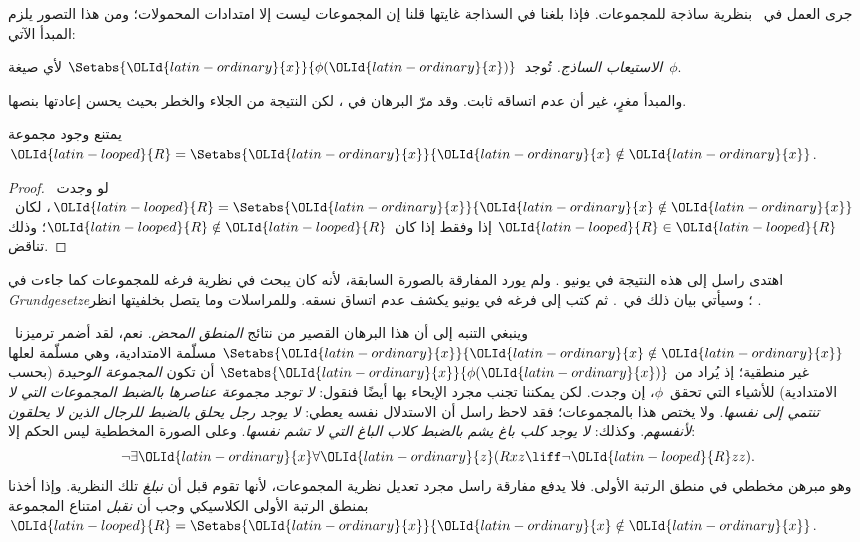 \documentclass[../../../include/open-logic-section]{subfiles}
\begin{document}

جرى العمل في~ بنظرية ساذجة للمجموعات. فإذا بلغنا
في السذاجة غايتها قلنا إن المجموعات ليست إلا امتدادات المحمولات؛ ومن
هذا التصور يلزم المبدأ الآتي:

\begin{defish}
  \emph{الاستيعاب الساذج.} تُوجد~$\Setabs{\OLId{latin-ordinary}{x}}{\phi(\OLId{latin-ordinary}{x})}$ لأي صيغة~$\phi$.
\end{defish}

والمبدأ مغرٍ، غير أن عدم اتساقه ثابت. وقد مرّ البرهان في
، لكن النتيجة من الجلاء والخطر بحيث يحسن
إعادتها بنصها.

\begin{thm}
يمتنع وجود مجموعة~$\OLId{latin-looped}{R} = \Setabs{\OLId{latin-ordinary}{x}}{\OLId{latin-ordinary}{x} \notin \OLId{latin-ordinary}{x}}$.
\end{thm}

\begin{proof}
لو وجدت~$\OLId{latin-looped}{R} = \Setabs{\OLId{latin-ordinary}{x}}{\OLId{latin-ordinary}{x} \notin \OLId{latin-ordinary}{x}}$، لكان~$\OLId{latin-looped}{R} \in \OLId{latin-looped}{R}$ إذا وفقط إذا
كان~$\OLId{latin-looped}{R} \notin \OLId{latin-looped}{R}$؛ وذلك تناقض.
\end{proof}

اهتدى راسل إلى هذه النتيجة في يونيو . ولم يورد المفارقة بالصورة
السابقة، لأنه كان يبحث في نظرية فرغه للمجموعات كما جاءت في
\emph{Grundgesetze}؛ وسيأتي بيان ذلك في~. ثم كتب إلى
فرغه في  يونيو  يكشف عدم اتساق نسقه. وللمراسلات وما يتصل بخلفيتها
انظر
\citet[pp.~124--8]{Heijenoort1967}.

وينبغي التنبه إلى أن هذا البرهان القصير من نتائج \emph{المنطق المحض}.
نعم، لقد أضمر ترميزنا~$\Setabs{\OLId{latin-ordinary}{x}}{\OLId{latin-ordinary}{x} \notin \OLId{latin-ordinary}{x}}$ مسلّمة الامتدادية،
وهي مسلّمة لعلها غير منطقية؛ إذ يُراد من
$\Setabs{\OLId{latin-ordinary}{x}}{\phi(\OLId{latin-ordinary}{x})}$ أن تكون \emph{المجموعة الوحيدة} (بحسب
الامتدادية) للأشياء التي تحقق~$\phi$، إن وجدت. لكن يمكننا تجنب مجرد
الإيحاء بها أيضًا فنقول: \emph{لا توجد مجموعة عناصرها بالضبط المجموعات
التي لا تنتمي إلى نفسها}. ولا يختص هذا بالمجموعات؛ فقد لاحظ راسل أن
الاستدلال نفسه يعطي: \emph{لا يوجد رجل يحلق بالضبط للرجال الذين لا
يحلقون لأنفسهم}. وكذلك: \emph{لا يوجد كلب باغ يشم بالضبط كلاب الباغ
التي لا تشم نفسها}. وعلى الصورة المخططية ليس الحكم إلا:
\[
\lnot \exists \OLId{latin-ordinary}{x} \forall \OLId{latin-ordinary}{z}(Rxz \liff \lnot \OLId{latin-looped}{R} zz).
\]
وهو مبرهن مخططي في منطق الرتبة الأولى. فلا يدفع مفارقة راسل مجرد تعديل
نظرية المجموعات، لأنها تقوم قبل أن \emph{نبلغ} تلك النظرية. وإذا أخذنا
بمنطق الرتبة الأولى الكلاسيكي وجب أن \emph{نقبل} امتناع المجموعة
$\OLId{latin-looped}{R} = \Setabs{\OLId{latin-ordinary}{x}}{\OLId{latin-ordinary}{x}\notin \OLId{latin-ordinary}{x}}$.
\end{document}
